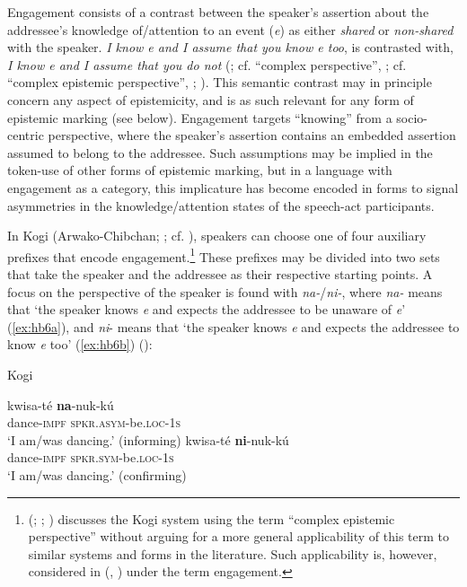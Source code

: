 \documentclass[output=paper]{langsci/langscibook}
\begin{document}
Engagement consists of a contrast between the speaker’s assertion about the addressee’s knowledge of/attention to an event (\textit{e}) as either \emph{shared} or \emph{non-shared} with the speaker. \emph{I know e and I assume that you know e too}, is contrasted with, \emph{I know e and I assume that you do not} (\citealt{Evansetal2017a}; cf. “complex perspective”, \citealt{Evans2005}; cf. “complex epistemic perspective”, \citealt{Bergqvist2015,Bergqvist2016}; \citeyear{Bergqvist2017}). This semantic contrast may in principle concern any aspect of epistemicity, and is as such relevant for any form of epistemic marking (see below). Engagement targets “knowing” from a socio-centric perspective, where the speaker’s assertion contains an embedded assertion assumed to belong to the addressee. Such assumptions may be implied in the token-use of other forms of epistemic marking, but in a language with engagement as a category, this implicature has become encoded in forms to signal asymmetries in the knowledge/attention states of the speech-act participants.


In Kogi (Arwako-Chibchan; \citealt{Bergqvist2016}; cf. \citealt{Ortiz1994}), speakers can choose one of four auxiliary prefixes that encode engagement.\footnote{\citeauthor{Bergqvist2015} (\citeyear{Bergqvist2015}; \citeyear{Bergqvist2016}; \citeyear{Bergqvist2017}) discusses the Kogi system using the term “complex epistemic perspective” without arguing for a more general applicability of this term to similar systems and forms in the literature. Such applicability is, however, considered in \citeauthor{Evansetal2017a} (\citeyear{Evansetal2017a}, \citeyear{Evansetal2017b}) under the term engagement.} 
These prefixes may be divided into two sets that take the speaker and the addressee as their respective starting points. A focus on the perspective of the speaker is found with \textit{na-}/\textit{ni-}, where \textit{na-} means that ‘the speaker knows \textit{e} and expects the addressee to be unaware of \textit{e}’ (\ref{ex:hb6a}), and \textit{ni}- means that ‘the speaker knows \textit{e} and expects the addressee to know \textit{e} too’ (\ref{ex:hb6b}) (\citealt[2]{Bergqvist2016}):

\begin{exe}
\ex Kogi\label{ex:hb6}
	\begin{xlist}
	\ex \label{ex:hb6a}
	\gll kwisa-té	\textbf{na}-nuk-kú\\
	dance-\textsc{impf}	\textsc{spkr}.\textsc{asym}-be.\textsc{loc}-1\textsc{s}\\
	\trans ‘I am/was dancing.’ (informing) 
	\ex \label{ex:hb6b}
	\gll kwisa-té	\textbf{ni}-nuk-kú\\
	dance-\textsc{impf}	\textsc{spkr}.\textsc{sym}-be.\textsc{loc}-1\textsc{s}\\
	\trans ‘I am/was dancing.’ (confirming)  
	\end{xlist}
\end{exe}
\end{document}
